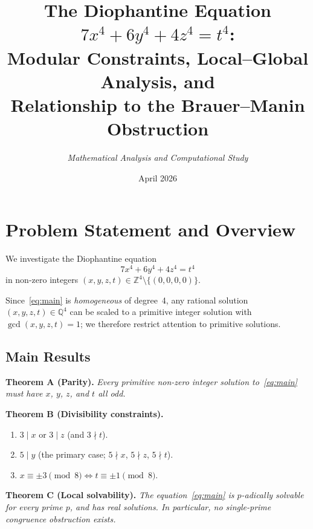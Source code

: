 \documentclass[12pt, a4paper]{article}
\title{\bfseries\Large The Diophantine Equation $7x^4+6y^4+4z^4 = t^4$:\\[4pt]
       \large Modular Constraints, Local–Global Analysis, and\\
       Relationship to the Brauer--Manin Obstruction}
\author{\itshape Mathematical Analysis and Computational Study}
\date{April 2026}
\theoremstyle{definition}
\begin{document}
\maketitle
\tableofcontents
\newpage

\section{Problem Statement and Overview}

We investigate the Diophantine equation
\begin{equation}\label{eq:main}
  7x^4 + 6y^4 + 4z^4 = t^4
\end{equation}
in non-zero integers $(x, y, z, t) \in \mathbb{Z}^4 \setminus \{(0,0,0,0)\}$.

Since~\eqref{eq:main} is \emph{homogeneous} of degree~4, any rational solution
$(x,y,z,t) \in \mathbb{Q}^4$ can be scaled to a primitive integer solution with
$\gcd(x,y,z,t)=1$; we therefore restrict attention to primitive solutions.

\subsection*{Main Results}

\begin{tcolorbox}[open]
  \textbf{Theorem A (Parity).}  \textit{Every primitive non-zero integer solution
  to~\eqref{eq:main} must have $x$, $y$, $z$, and $t$ all odd.}
\end{tcolorbox}

\begin{tcolorbox}[open]
  \textbf{Theorem B (Divisibility constraints).}
  \begin{enumerate}[label=\textup{(\roman*)}]
    \item $3 \mid x$ \textup{or} $3 \mid z$ (and $3 \nmid t$).
    \item $5 \mid y$ (the primary case; $5 \nmid x$, $5 \nmid z$, $5 \nmid t$).
    \item $x \equiv \pm 3 \pmod{8} \Longleftrightarrow t \equiv \pm 1 \pmod{8}$.
  \end{enumerate}
\end{tcolorbox}

\begin{tcolorbox}[open]
  \textbf{Theorem C (Local solvability).}  \textit{The equation~\eqref{eq:main}
  is $p$-adically solvable for every prime $p$, and has real solutions.
  In particular, no single-prime congruence obstruction exists.}
\end{tcolorbox}
\end{document}
